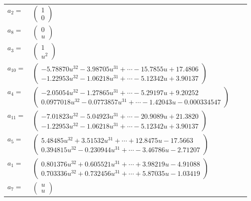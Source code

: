 \documentclass[1p]{elsarticle_modified}
\theoremstyle{definition}
\begin{document}
\begin{tabular}{m{7pt} m{180pt} m{7pt} m{180pt} }
\flushright $a_{2}=$&$\begin{pmatrix}1\\0\end{pmatrix}$ \\
\flushright $a_{8}=$&$\begin{pmatrix}0\\u\end{pmatrix}$ \\
\flushright $a_{3}=$&$\begin{pmatrix}1\\u^2\end{pmatrix}$ \\
\flushright $a_{10}=$&$\begin{pmatrix}-5.78870 u^{32}-3.98705 u^{31}+\cdots-15.7855 u+17.4806\\-1.22953 u^{32}-1.06218 u^{31}+\cdots-5.12342 u+3.90137\end{pmatrix}$ \\
\flushright $a_{4}=$&$\begin{pmatrix}-2.05054 u^{32}-1.27865 u^{31}+\cdots-5.29197 u+9.20252\\0.0977018 u^{32}-0.0773857 u^{31}+\cdots-1.42043 u-0.000334547\end{pmatrix}$ \\
\flushright $a_{11}=$&$\begin{pmatrix}-7.01823 u^{32}-5.04923 u^{31}+\cdots-20.9089 u+21.3820\\-1.22953 u^{32}-1.06218 u^{31}+\cdots-5.12342 u+3.90137\end{pmatrix}$ \\
\flushright $a_{5}=$&$\begin{pmatrix}5.48485 u^{32}+3.51532 u^{31}+\cdots+12.8475 u-17.5663\\0.394815 u^{32}-0.230944 u^{31}+\cdots-3.46786 u-2.71207\end{pmatrix}$ \\
\flushright $a_{1}=$&$\begin{pmatrix}0.801376 u^{32}+0.605521 u^{31}+\cdots+3.98219 u-4.91088\\0.703336 u^{32}+0.732456 u^{31}+\cdots+5.87035 u-1.03419\end{pmatrix}$ \\
\flushright $a_{7}=$&$\begin{pmatrix}u\\u\end{pmatrix}$ \\

\end{tabular}
\end{document}
